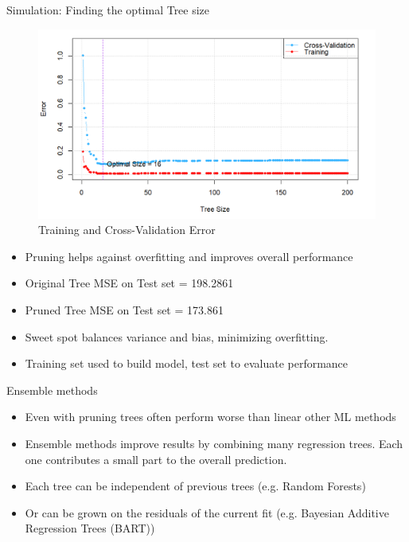 \documentclass[10pt]{beamer}
\begin{document}
\begin{frame}{Simulation: Finding the optimal Tree size}
    \begin{figure}
        \centering
        \includegraphics[scale=0.40]{Pruning.png}
        \caption{Training and Cross-Validation Error}
        \label{fig:sub10}  %
    \end{figure}
    \begin{itemize}
        \item Pruning helps against overfitting and improves overall performance
        \item Original Tree MSE on Test set = 198.2861
        \item Pruned Tree MSE on Test set = 173.861
        \item Sweet spot balances variance and bias, minimizing overfitting.
        \item Training set used to build model, test set to evaluate performance
    \end{itemize}
\end{frame}


\begin{frame}{Ensemble methods}
    \begin{itemize}
        \item Even with pruning trees often perform worse than linear other ML methods
        \item Ensemble methods improve results by combining many regression trees. Each one contributes a small part to the overall prediction.
        \item Each tree can be independent of previous trees (e.g. Random Forests)
        \item Or can be grown on the residuals of the current fit (e.g. Bayesian Additive Regression Trees (BART))
    \end{itemize}
\end{frame}
\end{document}
